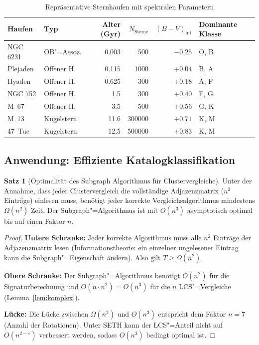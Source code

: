 ﻿\documentclass[a4paper,12pt]{article}
\theoremstyle{definition}
\newtheorem{satz}{Satz}
\begin{document}
\begin{table}[ht]
\centering
\caption{Repräsentative Sternhaufen mit spektralen Parametern}
\label{tab:haufen}
\small
\begin{tabular}{llrrrl}
\toprule
\textbf{Haufen} & \textbf{Typ} & \textbf{Alter (Gyr)} &
\textbf{$N_{\text{Sterne}}$} & \textbf{$(B-V)_{\text{int}}$} &
\textbf{Dominante Klasse} \\
\midrule
NGC 6231   & OB"=Assoz.     & 0.003 &    500 & $-0.25$ & O, B \\
Plejaden   & Offener H.     & 0.115 &   1000 & $+0.04$ & B, A \\
Hyaden     & Offener H.     & 0.625 &    300 & $+0.18$ & A, F \\
NGC 752    & Offener H.     & 1.5   &    300 & $+0.40$ & F, G \\
M~67       & Offener H.     & 3.5   &    500 & $+0.56$ & G, K \\
M~13       & Kugelstern     & 11.6  & 300000 & $+0.71$ & K, M \\
47~Tuc     & Kugelstern     & 12.5  & 500000 & $+0.83$ & K, M \\
\bottomrule
\end{tabular}
\end{table}

\subsection{Anwendung: Effiziente Katalogklassifikation}

\begin{satz}[Optimalität des Subgraph Algorithmus für Clustervergleiche]
\label{satz:opt_cluster}
    Unter der Annahme, dass jeder Clustervergleich die vollständige
    Adjazenzmatrix ($n^2$ Einträge) einlesen muss, benötigt jeder
    korrekte Vergleichsalgorithmus mindestens $\Omega(n^2)$ Zeit.
    Der Subgraph"=Algorithmus ist mit $O(n^3)$ asymptotisch optimal
    bis auf einen Faktor $n$.
\end{satz}

\begin{proof}
    \textbf{Untere Schranke:} Jeder korrekte Algorithmus muss alle $n^2$
    Einträge der Adjazenzmatrix lesen (Informationstheorie: ein einzelner
    ungelesener Eintrag kann die Subgraph"=Eigenschaft ändern).
    Also gilt $T \geq \Omega(n^2)$.

    \textbf{Obere Schranke:} Der Subgraph"=Algorithmus benötigt
    $O(n^2)$ für die Signaturberechnung und $O(n \cdot n^2) = O(n^3)$
    für die $n$ LCS"=Vergleiche (Lemma~\ref{lem:komplex}).

    \textbf{Lücke:} Die Lücke zwischen $\Omega(n^2)$ und $O(n^3)$
    entspricht dem Faktor $n = 7$ (Anzahl der Rotationen).
    Unter SETH kann der LCS"=Anteil nicht auf $O(n^{2-\varepsilon})$
    verbessert werden, sodass $O(n^3)$ bedingt optimal ist. \qedhere
\end{proof}
\end{document}

